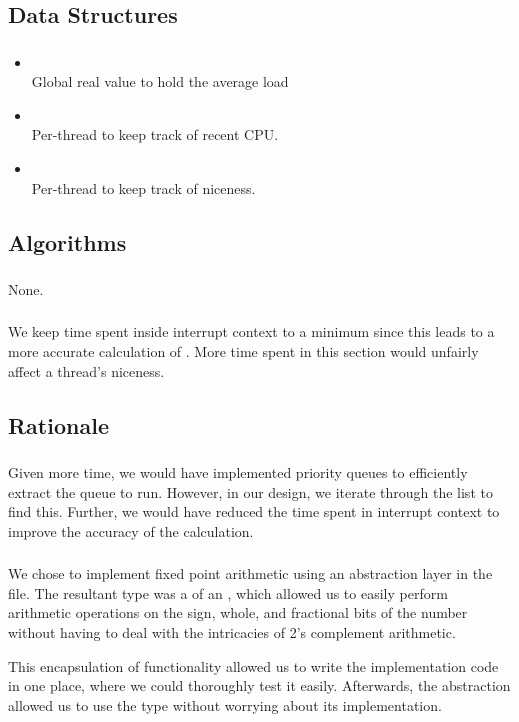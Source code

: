 \subsection{Data Structures}
	\subsubsection{}\begin{itemize}
		\item {}\\Global real value to hold the average load
		\item {}\\ Per-thread to keep track of recent CPU.
		\item {}\\ Per-thread to keep track of niceness.
	\end{itemize}
	
\subsection{Algorithms}
	\subsubsection{}
	\subsubsection{}
	None.
	\subsubsection{}
	We keep time spent inside interrupt context to a minimum since this leads to a more accurate calculation of . More time spent in this section would unfairly affect a thread's niceness.
\subsection{Rationale}
	\subsubsection{}
		Given more time, we would have implemented priority queues to efficiently extract the queue to run. However, in our design, we iterate through the list to find this. Further, we would have reduced the time spent in interrupt context to improve the accuracy of the calculation.
	\subsubsection{}
		We chose to implement fixed point arithmetic using an abstraction layer in the  file. The resultant  type was a  of an , which allowed us to easily perform arithmetic operations on the sign, whole, and fractional bits of the number without having to deal with the intricacies of 2's complement arithmetic.
		
		This encapsulation of functionality allowed us to write the implementation code in one place, where we could thoroughly test it easily. Afterwards, the abstraction allowed us to use the  type without worrying about its implementation.